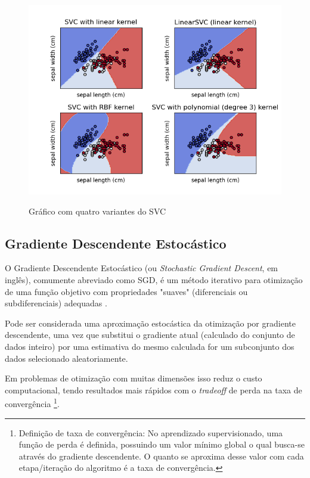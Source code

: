 \begin{figure}[ht]
    \centering
    \caption{Gráfico com quatro variantes do SVC}
    \includegraphics[width=14cm]{figuras/plot-svc.png} 
    \label{fig:internet} 
\end{figure}

\subsection{Gradiente Descendente Estocástico}

O Gradiente Descendente Estocástico (ou \textit{Stochastic Gradient Descent}, em inglês), comumente abreviado como SGD, é um método iterativo para otimização de uma função objetivo com propriedades "suaves" (diferenciais ou subdiferenciais) adequadas \cite{ruder2016overview}.

Pode ser considerada uma aproximação estocástica da otimização por gradiente descendente, uma vez que substitui o gradiente atual (calculado do conjunto de dados inteiro) por uma estimativa do mesmo calculada for um subconjunto dos dados selecionado aleatoriamente.

Em problemas de otimização com muitas dimensões isso reduz o custo computacional, tendo resultados mais rápidos com o \textit{tradeoff} de perda na taxa de convergência \footnote{Definição de taxa de convergência: No aprendizado supervisionado, uma função de perda é definida, possuindo um valor mínimo global o qual busca-se através do gradiente descendente. O quanto se aproxima desse valor com cada etapa/iteração do algoritmo é a taxa de convergência.}.

